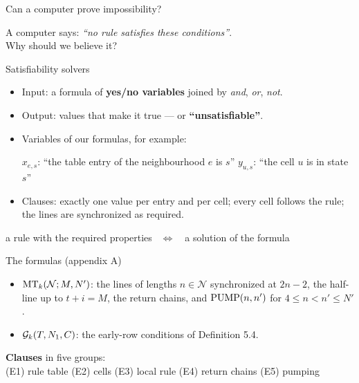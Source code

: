 

\begin{frame}{Can a computer prove impossibility?}
\vspace{5ex}
\begin{center}\Large
A computer says: \emph{``no rule satisfies these conditions''}.\\[2ex]
Why should we believe it?
\end{center}
\end{frame}

\begin{frame}{Satisfiability solvers}
\begin{itemize}
\item Input: a formula of \textbf{yes/no variables} joined by \emph{and}, \emph{or}, \emph{not}.
\item Output: values that make it true --- or \textbf{``unsatisfiable''}.
\item Variables of our formulas, for example:
\begin{center}
$x_{e,s}$: ``the table entry of the neighbourhood $e$ is $s$'' \qquad $y_{u,s}$: ``the cell $u$ is in state $s$''
\end{center}
\item Clauses: exactly one value per entry and per cell; every cell follows the rule; the lines are synchronized as required.
\end{itemize}
\begin{plainbox}\centering a rule with the required properties \ $\Longleftrightarrow$\ \ a solution of the formula\end{plainbox}
\end{frame}

\begin{frame}{The formulas (appendix A)}
\begin{itemize}
\item $\mathrm{MT}_k(\mathcal N;M,N')$: the lines of lengths $n\in\mathcal N$ synchronized at $2n-2$, the half-line up to $t+i=M$, the return chains, and $\mathrm{PUMP}(n,n')$ for $4\le n<n'\le N'$.
\item $\mathcal G_k(T,N_1,C)$: the early-row conditions of Definition 5.4.
\end{itemize}
\vspace{1ex}
\textbf{Clauses} in five groups:\\[0.5ex]
(E1) rule table \quad (E2) cells \quad (E3) local rule \quad (E4) return chains \quad (E5) pumping
\end{frame}

